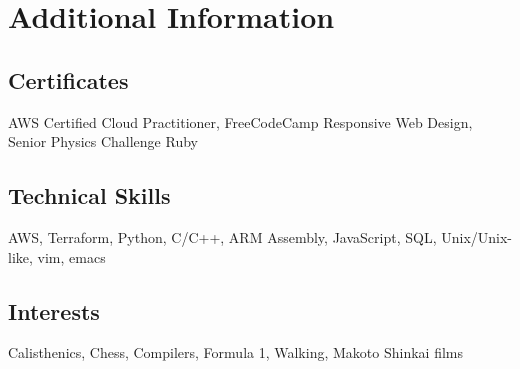 \section{Additional Information}
\subsection{Certificates}{}{AWS Certified Cloud Practitioner, FreeCodeCamp Responsive Web Design, Senior Physics Challenge Ruby}
\subsection{Technical Skills}{}{\hspace{10mm}AWS, Terraform, Python, C/C+{+}, ARM Assembly, JavaScript, SQL, Unix/Unix-like, vim, emacs}
\subsection{Interests}{}{\hfill Calisthenics, Chess, Compilers, Formula 1, Walking, Makoto Shinkai films}
